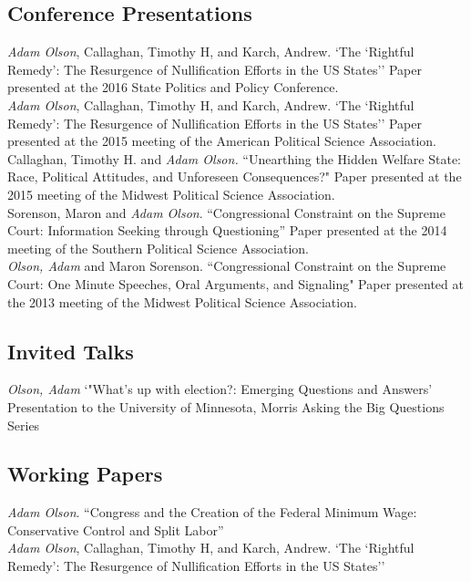 \documentclass[12pt, letter]{article}
\newcommand{\years}[1]{\marginnote{\normalsize #1}}
\begin{document}
\subsection*{Conference Presentations}
\noindent
\years{2016}\emph{Adam Olson}, Callaghan, Timothy H, and Karch, Andrew. `The `Rightful Remedy': The Resurgence of Nullification Efforts in the US States'' Paper presented at the 2016 State Politics and Policy Conference.\\

\years{2015}\emph{Adam Olson}, Callaghan, Timothy H, and Karch, Andrew. `The `Rightful Remedy': The Resurgence of Nullification Efforts in the US States'' Paper presented at the 2015 meeting of the American Political Science Association.\\

Callaghan, Timothy H. and \emph{Adam Olson.} ``Unearthing the Hidden Welfare State: Race, Political Attitudes, and Unforeseen Consequences?" Paper presented at the 2015 meeting of the Midwest Political Science Association.\\

\years{2014}Sorenson, Maron and \emph{Adam Olson}. ``Congressional Constraint on the Supreme Court: Information Seeking through Questioning'' Paper presented at the 2014 meeting of the Southern Political Science Association.\\

\years{2013}\emph{Olson, Adam} and Maron Sorenson. ``Congressional Constraint on the Supreme Court: One Minute Speeches, Oral Arguments, and Signaling" Paper presented at the 2013 meeting of the Midwest Political Science Association.

\subsection*{Invited Talks}
\years{2016} \textit{Olson, Adam} `"What's up with election?: Emerging Questions and Answers' Presentation to the University of Minnesota, Morris Asking the Big Questions Series
\subsection*{Working Papers}
\noindent
\emph{Adam Olson}. ``Congress and the Creation of the Federal Minimum Wage: Conservative Control and Split Labor'' \\

\emph{Adam Olson}, Callaghan, Timothy H, and Karch, Andrew. `The `Rightful Remedy': The Resurgence of Nullification Efforts in the US States'' \\
\end{document}

